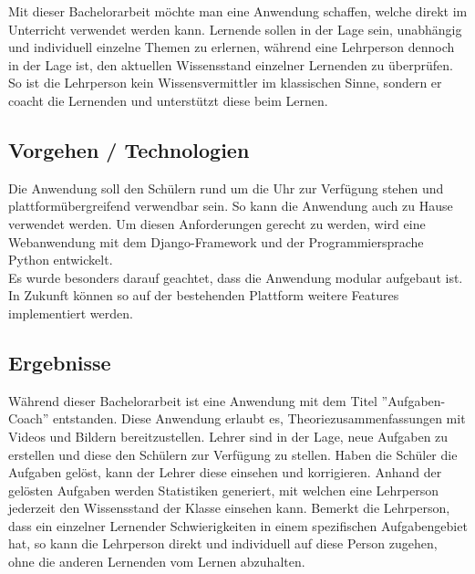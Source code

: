 Mit dieser Bachelorarbeit möchte man eine Anwendung schaffen, welche direkt im Unterricht verwendet werden kann. Lernende sollen in der Lage sein, unabhängig und individuell einzelne Themen zu erlernen, während eine Lehrperson dennoch in der Lage ist, den aktuellen Wissensstand einzelner Lernenden zu überprüfen. So ist die Lehrperson kein Wissensvermittler im klassischen Sinne, sondern er coacht die Lernenden und unterstützt diese beim Lernen.



\subsection{Vorgehen / Technologien}
Die Anwendung soll den Schülern rund um die Uhr zur Verfügung stehen und plattformübergreifend verwendbar sein. So kann die Anwendung auch zu Hause verwendet werden. Um diesen Anforderungen gerecht zu werden, wird eine Webanwendung mit dem Django-Framework und der Programmiersprache Python entwickelt. \\
Es wurde besonders darauf geachtet, dass die Anwendung modular aufgebaut ist. In Zukunft können so auf der bestehenden Plattform weitere Features implementiert werden.

\subsection{Ergebnisse}
Während dieser Bachelorarbeit ist eine Anwendung mit dem Titel ''Aufgaben-Coach'' entstanden. Diese Anwendung erlaubt es, Theoriezusammenfassungen mit Videos und Bildern bereitzustellen. Lehrer sind in der Lage, neue Aufgaben zu erstellen und diese den Schülern zur Verfügung zu stellen. Haben die Schüler die Aufgaben gelöst, kann der Lehrer diese einsehen und korrigieren. Anhand der gelösten Aufgaben werden Statistiken generiert, mit welchen eine Lehrperson jederzeit den Wissensstand der Klasse einsehen kann. Bemerkt die Lehrperson, dass ein einzelner Lernender Schwierigkeiten in einem spezifischen Aufgabengebiet hat, so kann die Lehrperson direkt und individuell auf diese Person zugehen, ohne die anderen Lernenden vom Lernen abzuhalten.

